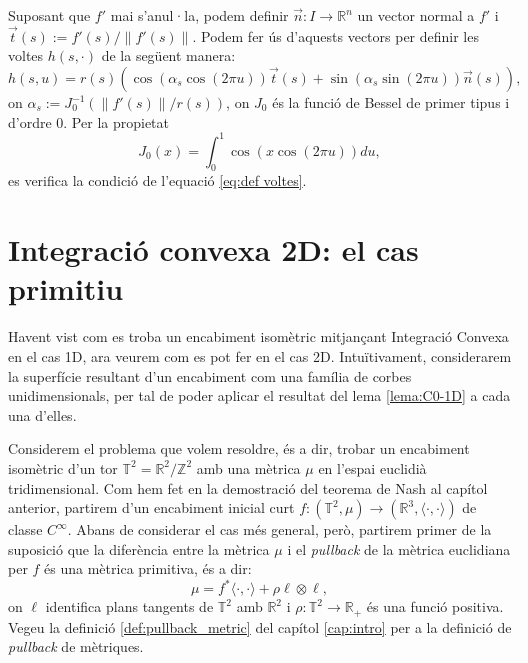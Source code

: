 Suposant que $f'$ mai s'anul·la, podem definir $\vec n:I\to\mathbb R^n$ un vector normal a $f'$ i $\vec t(s):=f'(s)/\|f'(s)\|$. Podem fer ús d'aquests vectors per definir les voltes $h(s, \cdot)$ de la següent manera:
\begin{equation*}
    h(s, u) = r(s)(\cos(\alpha_s\cos(2\pi u))\vec t(s) + \sin(\alpha_s\sin(2\pi u))\vec n(s)),
\end{equation*}
on $\alpha_s := J_0^{-1}(\|f'(s)\|/r(s))$, on $J_0$ és la funció de Bessel de primer tipus i d'ordre 0. Per la propietat
\begin{equation*}
    J_0(x) = \int_0^1 \cos(x\cos(2\pi u)) du,
\end{equation*}
es verifica la condició de l'equació \eqref{eq:def voltes}.

\section{Integració convexa 2D: el cas primitiu}
Havent vist com es troba un encabiment isomètric mitjançant Integració Convexa en el cas 1D, ara veurem com es pot fer en el cas 2D. Intuïtivament, considerarem la superfície resultant d'un encabiment com una família de corbes unidimensionals, per tal de poder aplicar el resultat del lema \ref{lema:C0-1D} a cada una d'elles.

Considerem el problema que volem resoldre, és a dir, trobar un encabiment isomètric d'un tor $\mathbb T^2 = \mathbb R^2/\mathbb Z^2$ amb una mètrica $\mu$ en l'espai euclidià tridimensional. Com hem fet en la demostració del teorema de Nash al capítol anterior, partirem d'un encabiment inicial curt $f:(\mathbb T^2, \mu)\to(\mathbb R^3, \langle\cdot, \cdot\rangle)$ de classe $C^\infty$. Abans de considerar el cas més general, però, partirem primer de la suposició que la diferència entre la mètrica $\mu$ i el \textit{pullback} de la mètrica euclidiana per $f$ és una mètrica primitiva, és a dir:
\begin{equation}\label{eq:def primitiva}
    \mu = f^*\langle\cdot, \cdot\rangle + \rho \ell\otimes \ell,
\end{equation}
on $\ell$ identifica plans tangents de $\mathbb T^2$ amb $\mathbb R^2$ i $\rho:\mathbb T^2\to\mathbb R_+$ és una funció positiva. Vegeu la definició \ref{def:pullback_metric} del capítol \ref{cap:intro} per a la definició de \textit{pullback} de mètriques.

